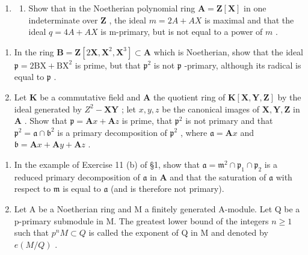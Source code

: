 
\begin{enumerate}
\def\labelenumi{\arabic{enumi}.}
\tightlist
\item
  \begin{enumerate}
  \def\labelenumii{(\alph{enumii})}
  \tightlist
  \item
    Show that in the Noetherian polynomial ring \(\mathbf{A} = \mathbf{Z}[\mathbf{X}]\) in one indeterminate over \(\mathbf{Z}\) , the ideal \(m = 2A + AX\) is maximal and that the ideal \(q = 4A + AX\) is m-primary, but is not equal to a power of \(m\) .
  \end{enumerate}
\end{enumerate}

\begin{enumerate}
\def\labelenumi{(\alph{enumi})}
\setcounter{enumi}{1}
\item
  In the ring \(\mathbf{B} = \mathbf{Z}[2\mathbf{X},\mathbf{X}^2,\mathbf{X}^3] \subset \mathbf{A}\) which is Noetherian, show that the ideal \(\mathfrak{p} = 2\mathrm{BX} + \mathrm{BX}^2\) is prime, but that \(\mathfrak{p}^2\) is not \(\mathfrak{p}\) -primary, although its radical is equal to \(\mathfrak{p}\) .
\item
  Let \(\mathbf{K}\) be a commutative field and \(\mathbf{A}\) the quotient ring of \(\mathbf{K}[\mathbf{X},\mathbf{Y},\mathbf{Z}]\) by the ideal generated by \(Z^2 -\mathbf{XY}\) ; let \(x,y,z\) be the canonical images of \(\mathbf{X},\mathbf{Y},\mathbf{Z}\) in \(\mathbf{A}\) . Show that \(\mathfrak{p} = \mathbf{A}x + \mathbf{A}z\) is prime, that \(\mathfrak{p}^2\) is not primary and that \(\mathfrak{p}^2 = \mathfrak{a}\cap \mathfrak{b}^2\) is a primary decomposition of \(\mathfrak{p}^2\) , where \(\mathfrak{a} = \mathbf{A}x\) and \(\mathfrak{b} = \mathbf{A}x + \mathbf{A}y + \mathbf{A}z\) .
\end{enumerate}

\begin{enumerate}
\def\labelenumi{\arabic{enumi}.}
\setcounter{enumi}{1}
\item
  In the example of Exercise 11 (b) of §1, show that \(\mathfrak{a} = \mathfrak{m}^2 \cap \mathfrak{p}_1 \cap \mathfrak{p}_2\) is a reduced primary decomposition of \(\mathfrak{a}\) in \(\mathbf{A}\) and that the saturation of \(\mathfrak{a}\) with respect to \(\mathfrak{m}\) is equal to \(\mathfrak{a}\) (and is therefore not primary).
\item
  Let A be a Noetherian ring and M a finitely generated A-module. Let Q be a p-primary submodule in M. The greatest lower bound of the integers \(n \geqslant 1\) such that \(p^{n}M \subset Q\) is called the exponent of Q in M and denoted by \(e(M/Q)\) .
\end{enumerate}


